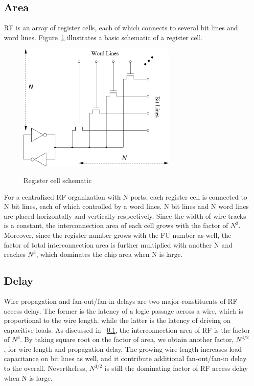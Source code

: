     \subsection{Area}
    \label{sec:area}
    RF is an array of register cells, each of which connects to several bit lines and word lines.
    Figure~\ref{fig:rf} illustrates a basic schematic of a register cell.
        \begin{figure}[!ht] 
            \caption{Register cell schematic}
            \centering
            \includegraphics[width=0.7\textwidth]{./figs/rf.eps}
            \label{fig:rf}
        \end{figure}
    For a centralized RF organization with N ports, 
    each register cell is connected to N bit lines, each of which controlled by a word lines.
    N bit lines and N word lines are placed horizontally and vertically respectively.
    Since the width of wire tracks is a constant, 
    the interconnection area of each cell grows with the factor of $N^2$.
    Moreover, since the register number grows with the FU number as well,
    the factor of total interconnection area is further multiplied with another N and reaches $N^3$,  
    which dominates the chip area when N is large.
    \subsection{Delay}
    Wire propagation and fan-out/fan-in delays are two major constituents of RF access delay.
    The former is the latency of a logic passage across a wire,
    which is proportional to the wire length, 
    while the latter is the latency of driving on capacitive loads.
    As discussed in ~\ref{sec:area}, the interconnection area of RF is the factor of $N^3$.
    By taking square root on the factor of area, 
    we obtain another factor, $N^{3/2}$, for wire length and propagation delay.
    The growing wire length increases load capacitance on bit lines as well, 
    and it contribute additional fan-out/fan-in delay to the overall.
    Nevertheless, $N^{3/2}$ is still the dominating factor of RF access delay when N is large.
